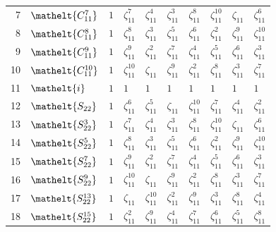 \documentclass[10pt,a4paper]{article}
\numberwithin{equation}{section}
\newcommand{\eltfont}[1]{{\let\sigma\eltsigma\mathelt{#1}}}
\newcommand{\cls}[1]{\eltfont{#1}}
\newcommand{\rootunity}[1]{\zeta_{#1}}
\begin{document}
{\begin{longtable}{@{}rlllllllll@{}}
7 & $\cls{C_{11}^{7}}$ & $1$ & $\rootunity{11}^{7}$ & $\rootunity{11}^{4}$ & $\rootunity{11}^{3}$ & $\rootunity{11}^{8}$ & $\rootunity{11}^{10}$ & $\rootunity{11}$ & $\rootunity{11}^{6}$\\
8 & $\cls{C_{11}^{8}}$ & $1$ & $\rootunity{11}^{8}$ & $\rootunity{11}^{3}$ & $\rootunity{11}^{5}$ & $\rootunity{11}^{6}$ & $\rootunity{11}^{2}$ & $\rootunity{11}^{9}$ & $\rootunity{11}^{10}$\\
9 & $\cls{C_{11}^{9}}$ & $1$ & $\rootunity{11}^{9}$ & $\rootunity{11}^{2}$ & $\rootunity{11}^{7}$ & $\rootunity{11}^{4}$ & $\rootunity{11}^{5}$ & $\rootunity{11}^{6}$ & $\rootunity{11}^{3}$\\
10 & $\cls{C_{11}^{10}}$ & $1$ & $\rootunity{11}^{10}$ & $\rootunity{11}$ & $\rootunity{11}^{9}$ & $\rootunity{11}^{2}$ & $\rootunity{11}^{8}$ & $\rootunity{11}^{3}$ & $\rootunity{11}^{7}$\\
11 & $\cls{i}$ & $1$ & $1$ & $1$ & $1$ & $1$ & $1$ & $1$ & $1$\\
12 & $\cls{S_{22}}$ & $1$ & $\rootunity{11}^{6}$ & $\rootunity{11}^{5}$ & $\rootunity{11}$ & $\rootunity{11}^{10}$ & $\rootunity{11}^{7}$ & $\rootunity{11}^{4}$ & $\rootunity{11}^{2}$\\
13 & $\cls{S_{22}^{3}}$ & $1$ & $\rootunity{11}^{7}$ & $\rootunity{11}^{4}$ & $\rootunity{11}^{3}$ & $\rootunity{11}^{8}$ & $\rootunity{11}^{10}$ & $\rootunity{11}$ & $\rootunity{11}^{6}$\\
14 & $\cls{S_{22}^{5}}$ & $1$ & $\rootunity{11}^{8}$ & $\rootunity{11}^{3}$ & $\rootunity{11}^{5}$ & $\rootunity{11}^{6}$ & $\rootunity{11}^{2}$ & $\rootunity{11}^{9}$ & $\rootunity{11}^{10}$\\
15 & $\cls{S_{22}^{7}}$ & $1$ & $\rootunity{11}^{9}$ & $\rootunity{11}^{2}$ & $\rootunity{11}^{7}$ & $\rootunity{11}^{4}$ & $\rootunity{11}^{5}$ & $\rootunity{11}^{6}$ & $\rootunity{11}^{3}$\\
16 & $\cls{S_{22}^{9}}$ & $1$ & $\rootunity{11}^{10}$ & $\rootunity{11}$ & $\rootunity{11}^{9}$ & $\rootunity{11}^{2}$ & $\rootunity{11}^{8}$ & $\rootunity{11}^{3}$ & $\rootunity{11}^{7}$\\
17 & $\cls{S_{22}^{13}}$ & $1$ & $\rootunity{11}$ & $\rootunity{11}^{10}$ & $\rootunity{11}^{2}$ & $\rootunity{11}^{9}$ & $\rootunity{11}^{3}$ & $\rootunity{11}^{8}$ & $\rootunity{11}^{4}$\\
18 & $\cls{S_{22}^{15}}$ & $1$ & $\rootunity{11}^{2}$ & $\rootunity{11}^{9}$ & $\rootunity{11}^{4}$ & $\rootunity{11}^{7}$ & $\rootunity{11}^{6}$ & $\rootunity{11}^{5}$ & $\rootunity{11}^{8}$\\

\end{longtable}}
\end{document}

